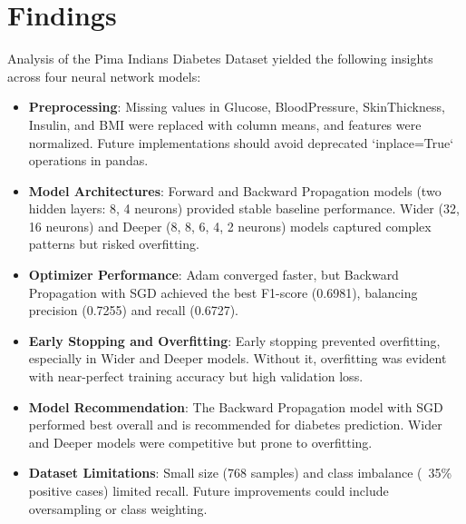 \documentclass[a4paper,12pt]{article}
\begin{document}
\section*{Findings}
Analysis of the Pima Indians Diabetes Dataset yielded the following insights across four neural network models:

\begin{itemize}
    \item \textbf{Preprocessing}: Missing values in Glucose, BloodPressure, SkinThickness, Insulin, and BMI were replaced with column means, and features were normalized. Future implementations should avoid deprecated `inplace=True` operations in pandas.
    
    \item \textbf{Model Architectures}: Forward and Backward Propagation models (two hidden layers: 8, 4 neurons) provided stable baseline performance. Wider (32, 16 neurons) and Deeper (8, 8, 6, 4, 2 neurons) models captured complex patterns but risked overfitting.
    
    \item \textbf{Optimizer Performance}: Adam converged faster, but Backward Propagation with SGD achieved the best F1-score (0.6981), balancing precision (0.7255) and recall (0.6727).
    
    \item \textbf{Early Stopping and Overfitting}: Early stopping prevented overfitting, especially in Wider and Deeper models. Without it, overfitting was evident with near-perfect training accuracy but high validation loss.
    
    \item \textbf{Model Recommendation}: The Backward Propagation model with SGD performed best overall and is recommended for diabetes prediction. Wider and Deeper models were competitive but prone to overfitting.
    
    \item \textbf{Dataset Limitations}: Small size (768 samples) and class imbalance (~35\% positive cases) limited recall. Future improvements could include oversampling or class weighting.
\end{itemize}
\end{document}
